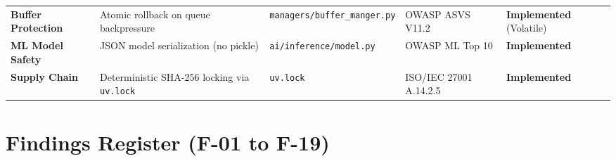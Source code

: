 \documentclass[10pt,a4paper]{report}
\begin{document}
\begin{table}[htbp]
\begin{tabularx}{\textwidth}{llllX}
\textbf{Buffer Protection} & Atomic rollback on queue backpressure & \texttt{managers/buffer\_manger.py} & OWASP ASVS V11.2 & \textbf{Implemented} (Volatile) \\
\textbf{ML Model Safety} & JSON model serialization (no pickle) & \texttt{ai/inference/model.py} & OWASP ML Top 10 & \textbf{Implemented} \\
\textbf{Supply Chain} & Deterministic SHA-256 locking via \texttt{uv.lock} & \texttt{uv.lock} & ISO/IEC 27001 A.14.2.5 & \textbf{Implemented} \\
\bottomrule
\end{tabularx}
\end{table}

\section{Findings Register (F-01 to F-19)}
\end{document}
